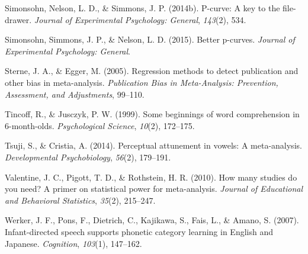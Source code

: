 \documentclass[english,floatsintext,man]{apa6}
\begin{document}
\hypertarget{ref-simonsohn2014p}{}
Simonsohn, Nelson, L. D., \& Simmons, J. P. (2014b). P-curve: A key to
the file-drawer. \emph{Journal of Experimental Psychology: General},
\emph{143}(2), 534.

\hypertarget{ref-simonsohn2015better}{}
Simonsohn, Simmons, J. P., \& Nelson, L. D. (2015). Better p-curves.
\emph{Journal of Experimental Psychology: General}.

\hypertarget{ref-sterne2005regression}{}
Sterne, J. A., \& Egger, M. (2005). Regression methods to detect
publication and other bias in meta-analysis. \emph{Publication Bias in
Meta-Analysis: Prevention, Assessment, and Adjustments}, 99--110.

\hypertarget{ref-tincoff1999some}{}
Tincoff, R., \& Jusczyk, P. W. (1999). Some beginnings of word
comprehension in 6-month-olds. \emph{Psychological Science},
\emph{10}(2), 172--175.

\hypertarget{ref-tsuji2014perceptual}{}
Tsuji, S., \& Cristia, A. (2014). Perceptual attunement in vowels: A
meta-analysis. \emph{Developmental Psychobiology}, \emph{56}(2),
179--191.

\hypertarget{ref-valentine2010many}{}
Valentine, J. C., Pigott, T. D., \& Rothstein, H. R. (2010). How many
studies do you need? A primer on statistical power for meta-analysis.
\emph{Journal of Educational and Behavioral Statistics}, \emph{35}(2),
215--247.

\hypertarget{ref-werker2007infant}{}
Werker, J. F., Pons, F., Dietrich, C., Kajikawa, S., Fais, L., \& Amano,
S. (2007). Infant-directed speech supports phonetic category learning in
English and Japanese. \emph{Cognition}, \emph{103}(1), 147--162.
\end{document}
